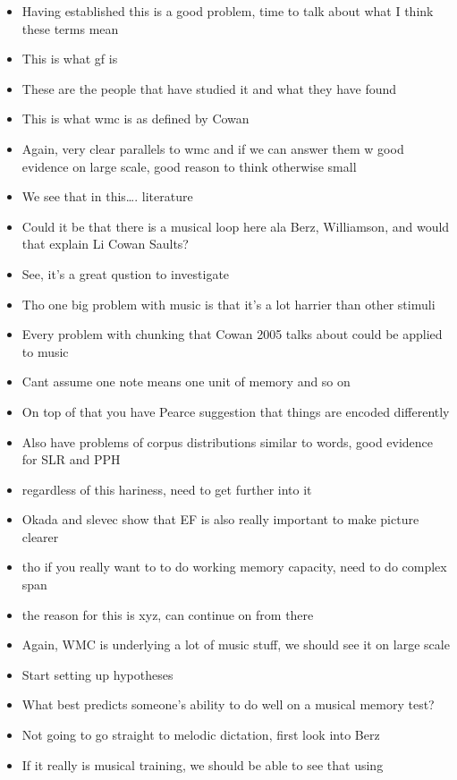 \documentclass[]{book}
\theoremstyle{definition}
\theoremstyle{definition}
\theoremstyle{definition}
\theoremstyle{remark}
\begin{document}
\begin{itemize}
\item
  Having established this is a good problem, time to talk about what I
  think these terms mean
\item
  This is what gf is
\item
  These are the people that have studied it and what they have found
\item
  This is what wmc is as defined by Cowan
\item
  Again, very clear parallels to wmc and if we can answer them w good
  evidence on large scale, good reason to think otherwise small
\item
  We see that in this\ldots{}. literature
\item
  Could it be that there is a musical loop here ala Berz, Williamson,
  and would that explain Li Cowan Saults?
\item
  See, it's a great qustion to investigate
\item
  Tho one big problem with music is that it's a lot harrier than other
  stimuli
\item
  Every problem with chunking that Cowan 2005 talks about could be
  applied to music
\item
  Cant assume one note means one unit of memory and so on
\item
  On top of that you have Pearce suggestion that things are encoded
  differently
\item
  Also have problems of corpus distributions similar to words, good
  evidence for SLR and PPH
\item
  regardless of this hariness, need to get further into it
\item
  Okada and slevec show that EF is also really important to make picture
  clearer
\item
  tho if you really want to to do working memory capacity, need to do
  complex span
\item
  the reason for this is xyz, can continue on from there
\item
  Again, WMC is underlying a lot of music stuff, we should see it on
  large scale
\item
  Start setting up hypotheses
\item
  What best predicts someone's ability to do well on a musical memory
  test?
\item
  Not going to go straight to melodic dictation, first look into Berz
\item
  If it really is musical training, we should be able to see that using

\end{itemize}
\end{document}
